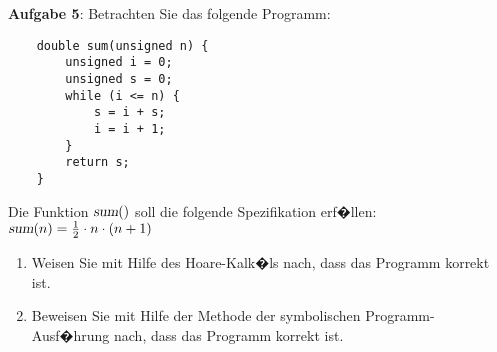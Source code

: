 \documentclass{article}
\begin{document}
\noindent
\textbf{Aufgabe 5}:  Betrachten Sie das folgende Programm:
\begin{verbatim}
    double sum(unsigned n) {
        unsigned i = 0;
        unsigned s = 0;
        while (i <= n) {
            s = i + s;
            i = i + 1;
        }
        return s;
    }
\end{verbatim}
Die Funktion $\textsl{sum}()$ soll die folgende Spezifikation erf�llen:
\\[0.2cm]
\hspace*{1.3cm} $\textsl{sum}(n) = \frac{1}{2} \cdot n \cdot (n + 1)$
\begin{enumerate}
\item Weisen Sie mit Hilfe des Hoare-Kalk�ls nach, dass das Programm korrekt ist.
\item Beweisen Sie mit Hilfe der Methode der symbolischen Programm-Ausf�hrung nach,
      dass das Programm korrekt ist.
\end{enumerate}
\vspace{0.3cm}
\end{document}
